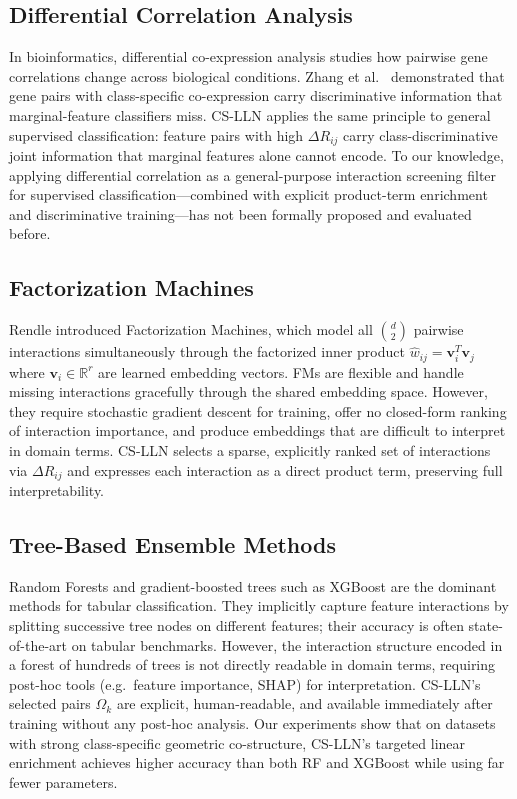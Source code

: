 \documentclass[conference]{IEEEtran}
\begin{document}
\subsection{Differential Correlation Analysis}

In bioinformatics, differential co-expression analysis \cite{hero2012}
studies how pairwise gene correlations change across biological conditions.
Zhang et al.\ \cite{zhang2008} demonstrated that gene pairs with
class-specific co-expression carry discriminative information that
marginal-feature classifiers miss.
CS-LLN applies the same principle to general supervised classification:
feature pairs with high $\Delta R_{ij}$ carry class-discriminative joint
information that marginal features alone cannot encode.
To our knowledge, applying differential correlation as a general-purpose
interaction screening filter for supervised classification---combined with
explicit product-term enrichment and discriminative training---has not been
formally proposed and evaluated before.

\subsection{Factorization Machines}

Rendle \cite{rendle2010} introduced Factorization Machines, which model all
$\binom{d}{2}$ pairwise interactions simultaneously through the factorized
inner product $\hat{w}_{ij} = \mathbf{v}_i^T \mathbf{v}_j$ where
$\mathbf{v}_i \in \mathbb{R}^r$ are learned embedding vectors.
FMs are flexible and handle missing interactions gracefully through the
shared embedding space.
However, they require stochastic gradient descent for training, offer no
closed-form ranking of interaction importance, and produce embeddings that
are difficult to interpret in domain terms.
CS-LLN selects a sparse, explicitly ranked set of interactions via
$\Delta R_{ij}$ and expresses each interaction as a direct product term,
preserving full interpretability.

\subsection{Tree-Based Ensemble Methods}

Random Forests \cite{pedregosa2011} and gradient-boosted trees such as
XGBoost \cite{chen2016} are the dominant methods for tabular classification.
They implicitly capture feature interactions by splitting successive tree
nodes on different features; their accuracy is often state-of-the-art on
tabular benchmarks.
However, the interaction structure encoded in a forest of hundreds of trees
is not directly readable in domain terms, requiring post-hoc tools (e.g.\
feature importance, SHAP) for interpretation.
CS-LLN's selected pairs $\Omega_k$ are explicit, human-readable, and
available immediately after training without any post-hoc analysis.
Our experiments show that on datasets with strong class-specific geometric
co-structure, CS-LLN's targeted linear enrichment achieves higher accuracy
than both RF and XGBoost while using far fewer parameters.
\end{document}
